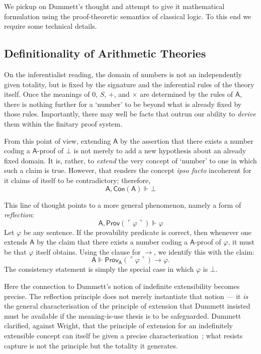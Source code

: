 \documentclass[reqno]{asl}
\newcommand{\supp}{\Vdash}
\newcommand{\pa}{\textsf{A}}
\newcommand{\Prov}{\textsf{Prov}}
\newcommand{\Con}{\textsf{Con}}
\begin{document}
We pickup on Dummett's thought and attempt to give it mathematical formulation using the proof-theoretic semantics of classical logic. To this end we require some technical details. 

\subsection*{Definitionality of Arithmetic Theories}

On the inferentialist reading, the domain of numbers is not an
independently given totality, but is fixed by the signature and the
inferential rules of the theory itself. Once the meanings of $0$, $S$, $+$,
and $\times$ are determined by the rules of $\pa$, there is nothing further
for a `number' to be beyond what is already fixed by those rules. Importantly, there may well be facts that outrun our ability to \emph{derive} them within the
finitary proof system.

From this point of view, extending $\pa$ by the assertion that there exists a
number coding a $\pa$-proof of $\bot$ is not merely to add a new hypothesis
about an already fixed domain. It is, rather, to \emph{extend} the very
concept of `number' to one in which such a claim is true. However, that renders the concept \emph{ipso facto} incoherent for it claims of itself to be contradictory; therefore,
\[
\pa, \Con(\pa) \supp \bot
\]

This line of thought points to a more general phenomenon, namely a form of
\emph{reflection}:
\[
\pa, \Prov(\ulcorner \varphi \urcorner) \supp \varphi
\]
Let $\varphi$ be any sentence. If the provability predicate is correct, then whenever one extends $\pa$ by the
claim that there exists a number coding a $\pa$-proof of $\varphi$, it must be that $\varphi$ itself
obtains. Using the clause for $\to$, we identify this with the claim:
\[
    \pa \supp \Prov_{\pa}(\ulcorner \varphi \urcorner) \to \varphi.
\]
The consistency statement is simply the special case in which $\varphi$ is
$\bot$.

Here the connection to Dummett's notion of indefinite extensibility becomes
precise. The reflection principle does not merely instantiate that notion ---
it \emph{is} the general characterisation of the principle of extension that
Dummett insisted must be available if the meaning-is-use thesis is to be
safeguarded. Dummett clarified, against Wright, that the principle
of extension for an indefinitely extensible concept can itself be given a
precise characterisation~\cite{Dummett1994}; what resists capture is not the principle but the
totality it generates. 
\end{document}
